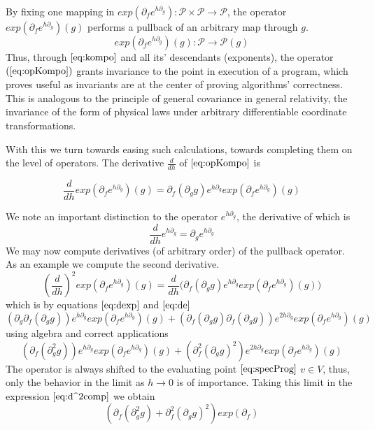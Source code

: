 \documentclass{article}
\newcommand{\dP}{\mathcal{P}}
\newcommand{\D}{\partial}
\begin{document}
 By fixing one mapping in $exp(\D_fe^{h\D_g}): \dP\times\dP\to\dP$, the operator $exp(\D_fe^{h\D_g})(g)$ performs a pullback of an arbitrary map through $g$. 
  \begin{equation}\label{eq:opKompo}
  exp(\D_fe^{h\D_g})(g): \dP\to\dP(g)
  \end{equation}
 Thus, through $\eqref{eq:kompo}$ and all its' descendants (exponents), the operator $(\ref{eq:opKompo})$ grants invariance to the point in execution of a program, which proves useful as invariants are at the center of proving algorithms' correctness. This is analogous to the principle of general covariance in general relativity, the invariance of the form of physical laws under arbitrary differentiable coordinate transformations.
 
 With this we turn towards easing such calculations, towards completing them on the level of operators. The derivative $\frac{d}{dh}$ of $\eqref{eq:opKompo}$ is
 
 \begin{equation}\label{eq:dexp}
 \frac{d}{dh}exp(\D_fe^{h\D_g})(g)=\D_f(\D_gg)e^{h\D_g}exp(\D_fe^{h\D_g})(g)
 \end{equation}
 
 We note an important distinction to the operator $e^{h\D_g}$, the derivative of which is
 \begin{equation}\label{eq:de}
\frac{d}{dh}e^{h\D_g}=\D_ge^{h\D_g}
 \end{equation}
 We may now compute derivatives (of arbitrary order) of the pullback operator. As an example we compute the second derivative.
 $$(\frac{d}{dh})^2exp(\D_fe^{h\D_g})(g)=\frac{d}{dh}\Big(\D_f(\D_gg)e^{h\D_g}exp(\D_fe^{h\D_g})(g)\Big)$$
 which is by equations $\eqref{eq:dexp}$ and $\eqref{eq:de}$
 $$(\D_g\D_f(\D_gg))e^{h\D_g}exp(\D_fe^{h\D_g})(g)+(\D_f(\D_gg)\D_f(\D_gg))e^{2h\D_g}exp(\D_fe^{h\D_g})(g)$$
 using algebra and correct applications
 \begin{equation}\label{eq:d^2comp}
 (\D_f(\D^2_gg))e^{h\D_g}exp(\D_fe^{h\D_g})(g)+(\D^2_f(\D_gg)^2)e^{2h\D_g}exp(\D_fe^{h\D_g})(g)
 \end{equation}
 The operator is always shifted to the evaluating point $\eqref{eq:specProg}$ $v\in V$, thus, only the behavior in the limit as $h\to 0$ is of importance. Taking this limit in the expression $\eqref{eq:d^2comp}$ we obtain
 \begin{equation}
	(\D_f(\D^2_gg)+\D^2_f(\D_gg)^2)exp(\D_f)
 \end{equation}
 
\end{document}
